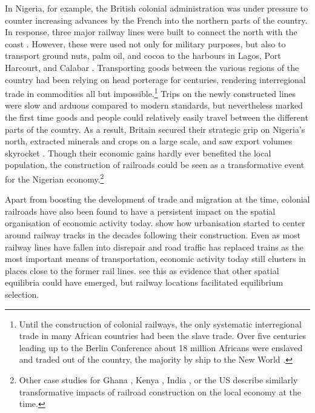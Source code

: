 \documentclass[11pt, oneside]{article}   	%
\begin{document}
In Nigeria, for example, the British colonial administration was under pressure to counter increasing advances by the French into the northern parts of the country. In response,  three major railway lines were built to connect the north with the coast \citep{Falola_historyNigeria_2008}. However, these were used not only for military purposes, but also to transport ground nuts, palm oil, and cocoa to the harbours in Lagos, Port Harcourt, and Calabar \citep{ekundare_economic_1973}. Transporting goods between the various regions of the country had been relying on head porterage for centuries, rendering interregional trade in commodities all but impossible.\footnote{Until the construction of colonial railways, the only systematic interregional trade in many African countries had been the slave trade. Over five centuries leading up to the Berlin Conference about 18 million Africans were enslaved and traded out of the country, the majority by ship to the New World \citep{nunn_long-term_2008}.} Trips on the newly constructed lines were slow and arduous compared to modern standards, but nevertheless marked the first time goods and people could relatively easily travel between the different parts of the country. As a result, Britain secured their strategic grip on Nigeria's north, extracted minerals and crops on a large scale, and saw export volumes skyrocket \citep{chaves_reinventing_2013,woltjer_economic_2018}. Though their economic gains hardly ever benefited the local population, the construction of railroads could be seen as a transformative event for the Nigerian economy.\footnote{Other case studies for Ghana \citep{jedwab_permanent_2016}, Kenya \citep{jedwab_history_2017}, India \citep{Donaldson_RailroadsRajEstimating_2018}, or the US \citep{donaldson_railroads_2016,swisher_reassessing_2017} describe similarly transformative impacts of railroad construction on the local economy at the time.}

Apart from boosting the development of trade and migration at the time, colonial railroads have also been found to have a persistent impact on the spatial organisation of economic activity today. \cite{jedwab_permanent_2016} show how urbanisation started to center around railway tracks in the decades following their construction. Even as most railway lines have fallen into disrepair and road traffic has replaced trains as the most important means of transportation, economic activity today still clusters in places close to the former rail lines. \citeauthor{jedwab_permanent_2016} see this as evidence that other spatial equilibria could have emerged, but railway locations facilitated equilibrium selection.
\end{document}
